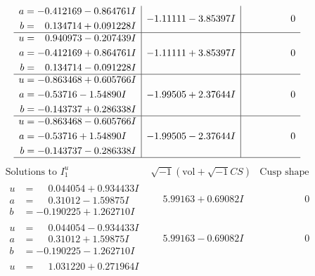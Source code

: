 \documentclass[1p]{elsarticle_modified}
\theoremstyle{definition}
\newcommand{\I}{\sqrt{-1}}
\begin{document}
$$\begin{array}{c|c|c}
\begin{aligned}
a &= -0.412169 - 0.864761 I \\
b &= \phantom{-}0.134714 + 0.091228 I\end{aligned}
 & -1.11111 - 3.85397 I & \phantom{-0.000000 } 0 \\ \hline\begin{aligned}
u &= \phantom{-}0.940973 - 0.207439 I \\
a &= -0.412169 + 0.864761 I \\
b &= \phantom{-}0.134714 - 0.091228 I\end{aligned}
 & -1.11111 + 3.85397 I & \phantom{-0.000000 } 0 \\ \hline\begin{aligned}
u &= -0.863468 + 0.605766 I \\
a &= -0.53716 - 1.54890 I \\
b &= -0.143737 + 0.286338 I\end{aligned}
 & -1.99505 + 2.37644 I & \phantom{-0.000000 } 0 \\ \hline\begin{aligned}
u &= -0.863468 - 0.605766 I \\
a &= -0.53716 + 1.54890 I \\
b &= -0.143737 - 0.286338 I\end{aligned}
 & -1.99505 - 2.37644 I & \phantom{-0.000000 } 0\\
 \hline 
 \end{array}$$\newpage$$\begin{array}{c|c|c}  
\text{Solutions to }I^u_{1}& \I (\text{vol} + \sqrt{-1}CS) & \text{Cusp shape}\\
 \hline 
\begin{aligned}
u &= \phantom{-}0.044054 + 0.934433 I \\
a &= \phantom{-}0.31012 - 1.59875 I \\
b &= -0.190225 + 1.262710 I\end{aligned}
 & \phantom{-}5.99163 + 0.69082 I & \phantom{-0.000000 } 0 \\ \hline\begin{aligned}
u &= \phantom{-}0.044054 - 0.934433 I \\
a &= \phantom{-}0.31012 + 1.59875 I \\
b &= -0.190225 - 1.262710 I\end{aligned}
 & \phantom{-}5.99163 - 0.69082 I & \phantom{-0.000000 } 0 \\ \hline\begin{aligned}
u &= \phantom{-}1.031220 + 0.271964 I \\

\end{aligned}
\end{array}$$
\end{document}
